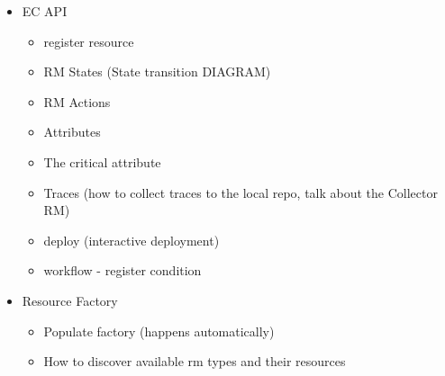 %
%
%
%
%
%


\begin{itemize}
  \item EC API
    \begin{itemize}
        \item register resource
        \item RM States (State transition DIAGRAM)
        \item RM Actions
        \item Attributes
        \item The critical attribute
        \item Traces (how to collect traces to the local repo, talk about the Collector RM)
        \item deploy (interactive deployment)
        \item workflow - register condition
    \end{itemize}
  \item Resource Factory
    \begin{itemize}
        \item Populate factory (happens automatically)
        \item How to discover available rm types and their resources
    \end{itemize}
\end{itemize}


